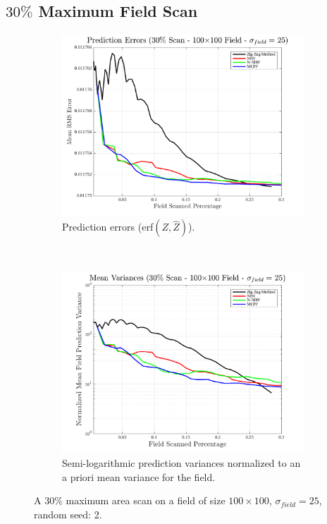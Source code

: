 \FloatBarrier
\clearpage
\subsection{$30\%$ Maximum Field Scan}
\begin{figure}[htb!]
    \centering
    \begin{subfigure}[t]{0.65\textwidth}
        \centering
        \includegraphics[width=\linewidth]{figures/hbresults/pred_errs_30p_100x100_sf_25_seed_2.png}
        \captionsetup{skip=0.20\baselineskip,size=footnotesize}
        \caption{Prediction errors (erf$(Z,\hat{Z})$).}
        \label{fig:prederrs_sigma25_p30_s2}
    \end{subfigure}%
    \\
    \begin{subfigure}[t]{0.65\textwidth}
        \centering
        \includegraphics[width=\linewidth]{figures/hbresults/vars_30p_100x100_sf_25_seed_2.png}
        \captionsetup{skip=0.20\baselineskip,size=footnotesize}
        \caption{Semi-logarithmic prediction variances normalized to an a priori mean variance for the field.}
        \label{fig:prederrs_sigma25_p30_s2}
    \end{subfigure}
    \captionsetup{skip=0.20\baselineskip}
    \caption{A $30\%$ maximum area scan on a field of size $100 \times 100$, $\sigma_{field} = 25$, random seed: 2.}
    \label{fig:sigma25_p30_s2}
\end{figure}

